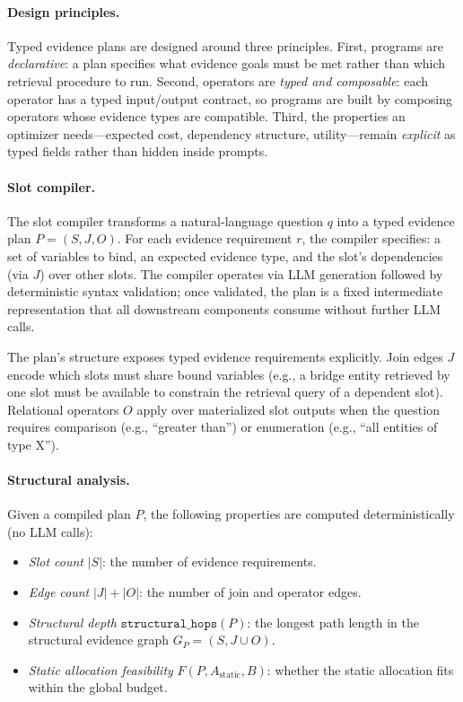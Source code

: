 \paragraph{Design principles.}
Typed evidence plans are designed around three principles. First, programs are \emph{declarative}: a plan specifies what evidence goals must be met rather than which retrieval procedure to run. Second, operators are \emph{typed and composable}: each operator has a typed input/output contract, so programs are built by composing operators whose evidence types are compatible. Third, the properties an optimizer needs---expected cost, dependency structure, utility---remain \emph{explicit} as typed fields rather than hidden inside prompts.

\paragraph{Slot compiler.}
The slot compiler transforms a natural-language question $q$ into a typed evidence plan $P = (S, J, O)$. For each evidence requirement $r$, the compiler specifies: a set of variables to bind, an expected evidence type, and the slot's dependencies (via $J$) over other slots. The compiler operates via LLM generation followed by deterministic syntax validation; once validated, the plan is a fixed intermediate representation that all downstream components consume without further LLM calls.

The plan's structure exposes typed evidence requirements explicitly. Join edges $J$ encode which slots must share bound variables (e.g., a bridge entity retrieved by one slot must be available to constrain the retrieval query of a dependent slot). Relational operators $O$ apply over materialized slot outputs when the question requires comparison (e.g., ``greater than'') or enumeration (e.g., ``all entities of type X'').

\paragraph{Structural analysis.}
Given a compiled plan $P$, the following properties are computed deterministically (no LLM calls):
\begin{itemize}
\item \emph{Slot count} $|S|$: the number of evidence requirements.
\item \emph{Edge count} $|J| + |O|$: the number of join and operator edges.
\item \emph{Structural depth} $\texttt{structural\_hops}(P)$: the longest path length in the structural evidence graph $G_P = (S, J \cup O)$.
\item \emph{Static allocation feasibility} $F(P, A_{\text{static}}, B)$: whether the static allocation fits within the global budget.
\end{itemize}

